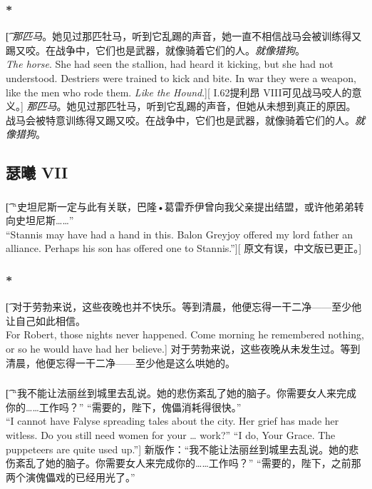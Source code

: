 \documentclass[12pt,a4paper]{article}
\begin{document}
\subsubsection{\color{red}*}\t[
	\emph{那匹马}。她见过那匹牡马，听到它乱踢的声音，她一直不相信战马会被训练得又踢又咬。在战争中，它们也是武器，就像骑着它们的人。\emph{就像猎狗}。\\
	\emph{The horse}. She had seen the stallion, had heard it kicking, but she had not understood. Destriers were trained to kick and bite. In war they were a weapon, like the men who rode them. \emph{Like the Hound}.][
	I.62提利昂 VIII可见战马咬人的意义。]
	\emph{那匹马}。她见过那匹牡马，听到它乱踢的声音，但她从未想到真正的原因。战马会被特意训练得又踢又咬。在战争中，它们也是武器，就像骑着它们的人。\emph{就像猎狗}。
	
\subsection{瑟曦 VII}
\subsubsection{}\t[
	“史坦尼斯一定与此有关联，巴隆•葛雷乔伊曾向我父亲提出结盟，或许他弟弟转向史坦尼斯……”\\
	“Stannis may have had a hand in this. Balon Greyjoy offered my lord father an alliance. Perhaps his son has offered one to Stannis.”][
	原文有误，中文版已更正。]
	

\subsubsection{\color{red}*}\t[
	 对于劳勃来说，这些夜晚也并不快乐。等到清晨，他便忘得一干二净——至少他让自己如此相信。\\
	 For Robert, those nights never happened. Come morning he remembered nothing, or so he would have had her believe.]
	 对于劳勃来说，这些夜晚从未发生过。等到清晨，他便忘得一干二净——至少他是这么哄她的。
	 
\subsubsection{}\t[
	“我不能让法丽丝到城里去乱说。她的悲伤紊乱了她的脑子。你需要女人来完成你的……工作吗？” “需要的，陛下，傀儡消耗得很快。” \\
	“I cannot have Falyse spreading tales about the city. Her grief has made her witless. Do you still need women for your … work?” “I do, Your Grace. The puppeteers are quite used up.”]
	新版作：“我不能让法丽丝到城里去乱说。她的悲伤紊乱了她的脑子。你需要女人来完成你的……工作吗？” “需要的，陛下，之前那两个演傀儡戏的已经用光了。” 
	
\end{document}
